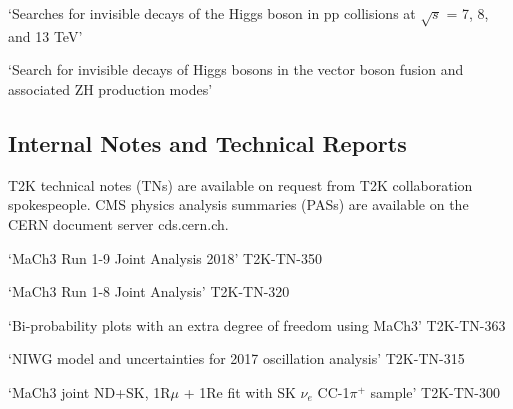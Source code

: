 \documentclass[12pt]{article}   %
\begin{document}
`Searches for invisible decays of the Higgs boson in pp collisions at $\sqrt{s}$ = 7, 8, and 13 TeV' \cite{Khachatryan:2016whc}

`Search for invisible decays of Higgs bosons in the vector boson fusion and associated ZH production modes' \cite{Chatrchyan:2014tja} %


\subsection*{Internal Notes and Technical Reports}
T2K technical notes (TNs) are available on request from T2K collaboration spokespeople. CMS physics analysis summaries (PASs) are available on the CERN document server cds.cern.ch.

`MaCh3 Run 1-9 Joint Analysis 2018' T2K-TN-350

`MaCh3 Run 1-8 Joint Analysis' T2K-TN-320

`Bi-probability plots with an extra degree of freedom using MaCh3' T2K-TN-363

`NIWG model and uncertainties for 2017 oscillation analysis' T2K-TN-315

`MaCh3 joint ND+SK, 1R$\mu$ + 1Re fit with SK $\nu_{e}$ CC-1$\pi^+$ sample' T2K-TN-300
\end{document}
